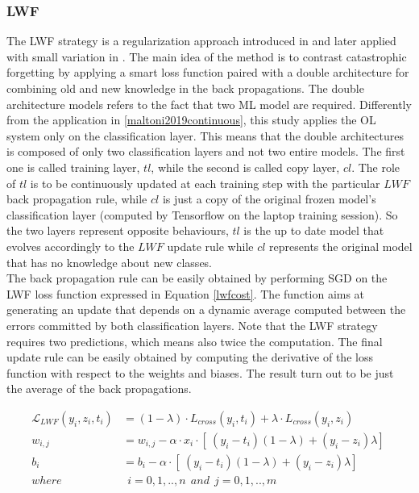 \documentclass[12pt]{report}
\begin{document}
\subsubsection{LWF}
The LWF strategy is a regularization approach introduced in \autocite{li2017learning} and later applied with small variation in \autocite{maltoni2019continuous}. The main idea of the method is to contrast catastrophic forgetting by applying a smart loss function paired with a double architecture for combining old and new knowledge in the back propagations. The double architecture models refers to the fact that two ML model are required. Differently from the application in \ref{maltoni2019continuous}, this study applies the OL system only on the classification layer. This means that the double architectures is composed of only two classification layers and not two entire models. The first one is called training layer, $tl$, while the second is called copy layer, $cl$. The role of $tl$ is to be continuously updated at each training step with the particular $LWF$ back propagation rule, while $cl$ is just a copy of the original frozen model's classification layer (computed by Tensorflow on the laptop training session). So the two layers represent opposite behaviours, $tl$ is the up to date model that evolves accordingly to the $LWF$ update rule while $cl$ represents the original model that has no knowledge about new classes. \\
The back propagation rule can be easily obtained by performing SGD on the LWF loss function expressed in Equation \ref{lwfcost}. The function aims at generating an update that depends on a dynamic average computed between the errors committed by both classification layers. Note that the LWF strategy requires two predictions, which means also twice the computation. The final update rule can be easily obtained by computing the derivative of the loss function with respect to the weights and biases. The result turn out to be just the average of the back propagations.

\begin{align}
	\mathcal{L}_{LWF} ( y_i, z_i, t_i) &=  (1-\lambda) \cdot{L}_{cross}(y_i, t_i) + \lambda \cdot{L}_{cross}(y_i, z_i) \label{lwfcost}\\
	w_{i,j} &= w_{i,j} - \alpha \cdot x_i \cdot [\ (y_i - t_i)(1-\lambda) + (y_i - z_i)\lambda ]\  \\
	b_i     &= b_i - \alpha \cdot [\ (y_i - t_i)(1-\lambda) + (y_i - z_i)\lambda ]\ \\
    where   & \: \: i= 0,1,..,n  \: \: and \: \:  j=0,1,..,m \nonumber  
\end{align}
\end{document}
